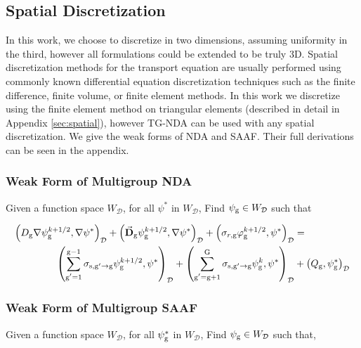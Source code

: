 \subsection{Spatial Discretization}
In this work, we choose to discretize in two dimensions, assuming uniformity in the third, however all formulations could be extended to be truly 3D. Spatial discretization methods for the transport equation are usually performed using commonly known differential equation discretization techniques such as the finite difference, finite volume, or finite element methods. In this work we discretize using the finite element method on triangular elements (described in detail in Appendix \ref{sec:spatial}), however TG-NDA can be used with any spatial discretization. We give the weak forms of NDA and SAAF. Their full derivations can be seen in the appendix. 



\subsubsection{Weak Form of Multigroup NDA}

Given a function space $W_\mathcal{D}$, for all $\psi^*$ in $W_\mathcal{D}$, Find $\psi_{\mathrm{g}} \in W_\mathcal{D}$ such that

\begin{equation}
 \begin{split}
  \left(D_{\mathrm{g}} \nabla \psi_{\mathrm{g}}^{k+1/2}, \nabla \psi^*\right)_\mathcal{D} + \left(\vec{\bf{D}}_{\mathrm{g}} \psi_{\mathrm{g}}^{k+1/2} , \nabla \psi^*\right)_\mathcal{D} +  \left(\sigma_{r,\mathrm{g}} \varphi_{\mathrm{g}}^{k+1/2}, \psi^*\right)_\mathcal{D} &=  \\
   \left(\sum\limits_{\substack{\mathrm{g}'=1}}^{\mathrm{g-1}} \sigma_{\mathrm{s},\mathrm{g}' \to\mathrm{g}}\psi_{\mathrm{g}}^{k+1/2}, \psi^*\right)_\mathcal{D} + \left(\sum\limits_{\substack{\mathrm{g}'=\mathrm{g}+1}}^{\mathrm{G}} \sigma_{\mathrm{s},\mathrm{g}' \to\mathrm{g}}\psi_{\mathrm{g}}^{k}, \psi^*\right)_\mathcal{D} 
  &+ \left(Q_{\mathrm{g}}, \psi^*_{\mathrm{g}}\right)_\mathcal{D} 
 \end{split}
 \label{k1/2}
\end{equation}


\subsubsection{Weak Form of Multigroup SAAF}

Given a function space $W_\mathcal{D}$, for all $\psi^*_{\mathrm{g}}$ in $W_\mathcal{D}$, Find $\psi_{\mathrm{g}} \in W_\mathcal{D}$ such that,

